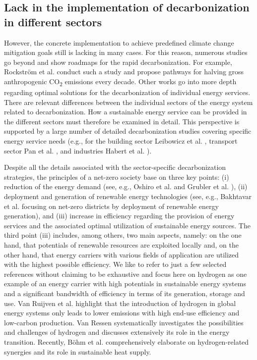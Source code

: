\subsection{Lack in the implementation of decarbonization in different sectors}
However, the concrete implementation to achieve predefined climate change mitigation goals still is lacking in many cases. For this reason, numerous studies go beyond and show roadmaps for the rapid decarbonization. For example, Rockstr{\"o}m et al. \cite{rockstrom2017roadmap} conduct such a study and propose pathways for halving gross anthropogenic CO\textsubscript{2} emissions every decade. Other works go into more depth regarding optimal solutions for the decarbonization of individual energy services. There are relevant differences between the individual sectors of the energy system related to decarbonization. How a sustainable energy service can be provided in the different sectors must therefore be examined in detail. This perspective is supported by a large number of detailed decarbonization studies covering specific energy service needs (e.g., for the building sector Leibowicz et al. \cite{leibowicz2018optimal}, transport sector Pan et al. \cite{pan2018decarbonization}, and industries Habert et al. \cite{habert2020environmental}).\vspace{0.3cm}

Despite all the details associated with the sector-specific decarbonization strategies, the principles of a net-zero society base on three key points: (i) reduction of the energy demand (see, e.g., Oshiro et al. \cite{oshiro2021enabling} and Grubler et al. \cite{grubler2018low}), (ii) deployment and generation of renewable energy technologies (see, e.g., Bakhtavar et al. \cite{bakhtavar2020assessment} focusing on net-zero districts by deployment of renewable energy generation), and (iii) increase in efficiency regarding the provision of energy services and the associated optimal utilization of sustainable energy sources. The third point (iii) includes, among others, two main aspects, namely: on the one hand, that potentials of renewable resources are exploited locally and, on the other hand, that energy carriers with various fields of application are utilized with the highest possible efficiency. We like to refer to just a few selected references without claiming to be exhaustive and focus here on hydrogen as one example of an energy carrier with high potentials in sustainable energy systems and a significant bandwidth of efficiency in terms of its generation, storage and use. Van Ruijven et al. \cite{van2007potential} highlight that the introduction of hydrogen in global energy systems only leads to lower emissions with high end-use efficiency and low-carbon production. Van Ressen \cite{van2020hydrogen} systematically investigates the possibilities and challenges of hydrogen and discusses extensively its role in the energy transition. Recently, Böhm et al. \cite{bohm2021power} comprehensively elaborate on hydrogen-related synergies and its role in sustainable heat supply.\vspace{0.3cm}

